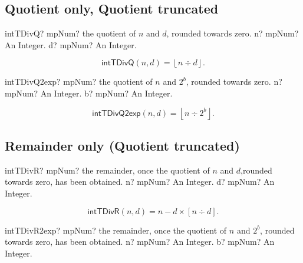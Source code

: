 \subsection{Quotient only, Quotient truncated}

\begin{mpFunctionsExtract}
	\mpFunctionTwo
	{intTDivQ? mpNum? the quotient of $n$ and $d$, rounded towards zero.}
	{n? mpNum? An Integer.}
	{d? mpNum? An Integer.}
\end{mpFunctionsExtract}

\begin{equation}
	\label{eq:intTDivQ}
	\textsf{intTDivQ}(n, d) =\left\lfloor n \div d\right\rfloor.
\end{equation}

\vspace{0.3cm}
\begin{mpFunctionsExtract}
	\mpFunctionTwo
	{intTDivQ2exp? mpNum? the quotient of $n$ and $2^b$, rounded towards zero.}
	{n? mpNum? An Integer.}
	{b? mpNum? An Integer.}
\end{mpFunctionsExtract}

\begin{equation}
	\label{eq:intTDivQ2exp}
	\textsf{intTDivQ2exp}(n, d) =\left\lfloor n \div 2^b\right\rfloor.
\end{equation}






\subsection{Remainder only (Quotient  truncated)}

\begin{mpFunctionsExtract}
	\mpFunctionTwo
	{intTDivR? mpNum? the remainder, once the quotient of $n$ and $d$,rounded towards zero, has been obtained.}
	{n? mpNum? An Integer.}
	{d? mpNum? An Integer.}
\end{mpFunctionsExtract}

\begin{equation}
	\label{eq:intTDivR}
	\textsf{intTDivR}(n, d) =n - d \times \left[ n \div d\right].
\end{equation}

\vspace{0.3cm}
\begin{mpFunctionsExtract}
	\mpFunctionTwo
	{intTDivR2exp? mpNum? the remainder, once the quotient of $n$ and $2^b$, rounded towards zero, has been obtained.}
	{n? mpNum? An Integer.}
	{b? mpNum? An Integer.}
\end{mpFunctionsExtract}

